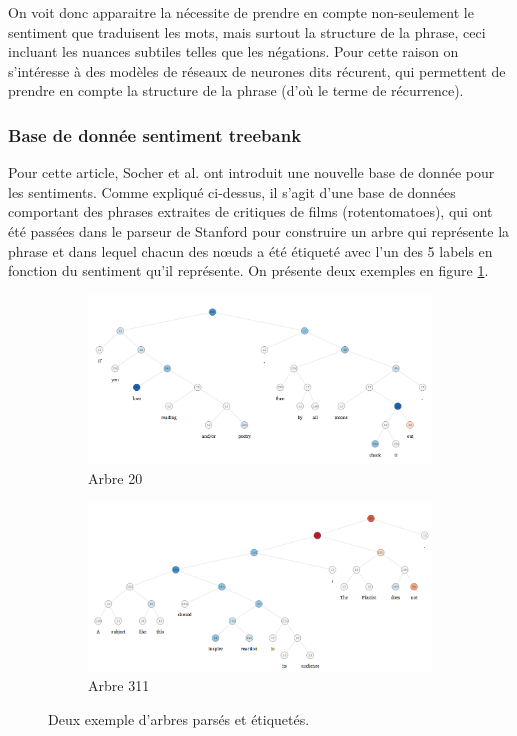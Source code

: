 \documentclass[conference]{IEEEtran}
\begin{document}
On voit donc apparaitre la nécessite de prendre en compte non-seulement le sentiment que traduisent les mots, mais surtout la structure de la phrase, ceci incluant les nuances subtiles telles que les négations. Pour cette raison on s'intéresse à des modèles de réseaux de neurones dits récurent, qui permettent de prendre en compte la structure de la phrase (d'où le terme de récurrence).

\subsubsection{Base de donnée sentiment treebank}
Pour cette article, Socher et al. ont introduit une nouvelle base de donnée pour les sentiments. Comme expliqué ci-dessus, il s'agit d'une base de données comportant des phrases extraites de critiques de films (rotentomatoes), qui ont été passées dans le parseur de Stanford pour construire un arbre qui représente la phrase et dans lequel chacun des nœuds a été étiqueté avec l'un des 5 labels en fonction du sentiment qu'il représente. On présente deux exemples en figure \ref{trees}.

\begin{figure}
\begin{subfigure}{0.45\textwidth}
\includegraphics[width=\textwidth]{fig/TB20.png}
\caption{Arbre 20}
\end{subfigure}
\begin{subfigure}{0.45\textwidth}
\includegraphics[width=\textwidth]{fig/TB311.png}
\caption{Arbre 311}
\end{subfigure}
\caption{Deux exemple d'arbres parsés et étiquetés.}
\label{trees}
\end{figure}
\end{document}

